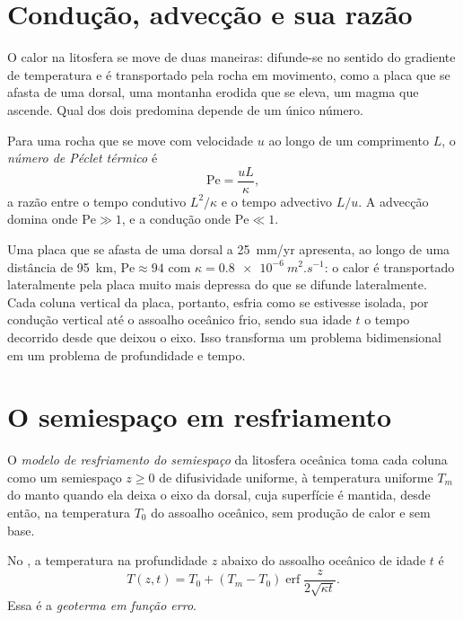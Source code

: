 \section{Condução, advecção e sua razão}

O calor na litosfera se move de duas maneiras: difunde-se no sentido do gradiente
de temperatura e é transportado pela rocha em movimento, como a placa que se afasta de uma dorsal, uma
montanha erodida que se eleva, um magma que ascende. Qual dos dois predomina depende de um único
número.

\begin{definition}\label{def:b3:lithosphere-thermal-models:peclet}
Para uma rocha que se move com velocidade $u$ ao longo de um comprimento $L$, o \emph{número de Péclet
térmico} é
\[
  \mathrm{Pe} = \frac{uL}{\kappa},
\]
a razão entre o tempo condutivo $L^2/\kappa$ e o tempo advectivo $L/u$.
A advecção domina onde $\mathrm{Pe} \gg 1$, e a condução onde
$\mathrm{Pe} \ll 1$.
\end{definition}

Uma placa que se afasta de uma dorsal a \qty{25}{mm/yr} apresenta, ao longo de uma distância de
\qty{95}{km}, $\mathrm{Pe} \approx 94$ com $\kappa = \qty{0.8e-6}{m^2.s^{-1}}$:
o calor é transportado lateralmente pela placa muito mais depressa do que se difunde lateralmente.
Cada coluna vertical da placa, portanto, esfria como se estivesse isolada, por condução
vertical até o assoalho oceânico frio, sendo sua idade $t$ o tempo decorrido desde que
deixou o eixo. Isso transforma um problema bidimensional em um problema de profundidade e
tempo.

\section{O semiespaço em resfriamento}

\begin{definition}\label{def:b3:lithosphere-thermal-models:half-space}
O \emph{modelo de resfriamento do semiespaço} da
litosfera oceânica toma cada coluna como um semiespaço $z \ge 0$ de difusividade uniforme,
à temperatura uniforme $T_m$ do manto quando ela deixa o eixo da dorsal,
cuja superfície é mantida, desde então, na temperatura $T_0$ do
assoalho oceânico, sem produção de calor e sem base.
\end{definition}

\begin{theorem}\label{thm:b3:lithosphere-thermal-models:erf}
No , a temperatura na profundidade $z$ abaixo do
assoalho oceânico de idade $t$ é
\[
  T(z, t) = T_0 + (T_m - T_0)\operatorname{erf}\frac{z}{2\sqrt{\kappa t}} .
\]
Essa é a \emph{geoterma em função erro}.
\end{theorem}

